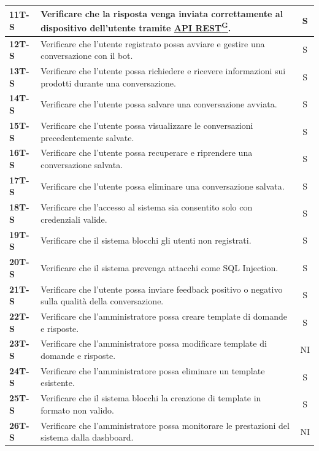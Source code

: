 \documentclass{article}
\begin{document}
\begin{longtable}{|>{\centering\arraybackslash}m{}|>{\raggedright\arraybackslash}m{}|c|}
    \hline
    \textbf{11T-S} & Verificare che la risposta venga inviata correttamente al dispositivo dell’utente tramite \href{https://code7crusaders.github.io/docs/PB/documentazione_interna/glossario.html#api-rest-representational-state-transfer}{API REST\textsuperscript{G}}. & S \\
    \hline
    \textbf{12T-S} & Verificare che l'utente registrato possa avviare e gestire una conversazione con il bot. & S \\
    \hline
    \textbf{13T-S} & Verificare che l’utente possa richiedere e ricevere informazioni sui prodotti durante una conversazione. & S \\
    \hline
    \textbf{14T-S} & Verificare che l’utente possa salvare una conversazione avviata. & S \\
    \hline
    \textbf{15T-S} & Verificare che l’utente possa visualizzare le conversazioni precedentemente salvate. & S \\
    \hline
    \textbf{16T-S} & Verificare che l’utente possa recuperare e riprendere una conversazione salvata. & S \\
    \hline
    \textbf{17T-S} & Verificare che l’utente possa eliminare una conversazione salvata. & S \\
    \hline
    \textbf{18T-S} & Verificare che l’accesso al sistema sia consentito solo con credenziali valide. & S \\
    \hline
    \textbf{19T-S} & Verificare che il sistema blocchi gli utenti non registrati. & S \\
    \hline
    \textbf{20T-S} & Verificare che il sistema prevenga attacchi come SQL Injection. & S \\
    \hline
    \textbf{21T-S} & Verificare che l’utente possa inviare feedback positivo o negativo sulla qualità della conversazione. & S \\
    \hline
    \textbf{22T-S} & Verificare che l’amministratore possa creare template di domande e risposte. & S \\
    \hline
    \textbf{23T-S} & Verificare che l’amministratore possa modificare template di domande e risposte. & NI \\
    \hline
    \textbf{24T-S} & Verificare che l’amministratore possa eliminare un template esistente. & S \\
    \hline
    \textbf{25T-S} & Verificare che il sistema blocchi la creazione di template in formato non valido. & S \\
    \hline
    \textbf{26T-S} & Verificare che l’amministratore possa monitorare le prestazioni del sistema dalla dashboard. & NI \\

\end{longtable}
\end{document}
